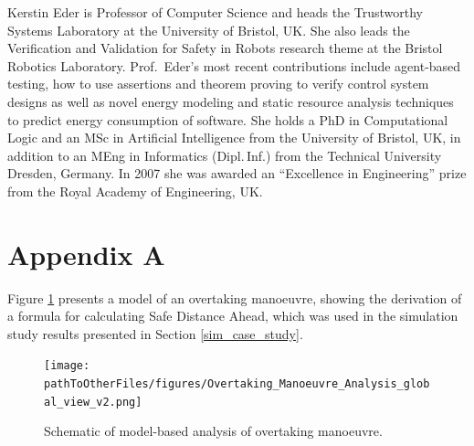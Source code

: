 \documentclass[letterpaper, 10 pt, journal, twoside]{IEEEtran}
\newcommand{\pathToSourceFiles}{../source}
\newcommand{\pathToOtherFiles}{../other}
\begin{document}
\begin{IEEEbiography}{{Kerstin Eder}} 
is Professor of Computer Science and heads the Trustworthy Systems Laboratory at the University of Bristol, UK. She also leads the Verification and Validation for Safety in Robots research theme at the  Bristol Robotics Laboratory. 
Prof.\ Eder's most recent contributions include agent-based testing, how to use assertions and theorem proving to verify control system designs as well as novel energy modeling and static resource analysis techniques to predict energy consumption of software. She holds a PhD in Computational Logic and an MSc in Artificial Intelligence from the University of Bristol, UK, in addition to an MEng in Informatics (Dipl.\,Inf.) from the Technical University Dresden, Germany. In 2007 she was awarded an ``Excellence in Engineering'' prize from the Royal Academy of Engineering, UK. 
\end{IEEEbiography}


\begingroup
\onecolumn 
\section*{Appendix A}\label{appendix_a}

Figure \ref{fig:overtaking_analysis_diag} presents a model of an overtaking manoeuvre, showing the derivation of a formula for calculating Safe Distance Ahead, which was used in the simulation study results presented in Section \ref{sim_case_study}.

\begin{figure}[h]
    \centering
    \texttt{[image: \\pathToOtherFiles/figures/Overtaking\_Manoeuvre\_Analysis\_global\_view\_v2.png]}
    \caption{Schematic of model-based analysis of overtaking manoeuvre.}
    \label{fig:overtaking_analysis_diag}
\end{figure}

\endgroup
\end{document}

